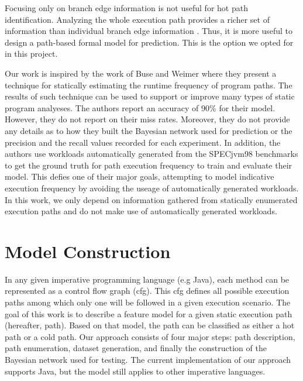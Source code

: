 \documentclass[10pt,twocolumn,letterpaper]{article}
\begin{document}
Focusing only on branch edge information is not useful for hot path identification. Analyzing the whole execution path provides a richer set of information
than individual branch edge information \cite{buse2009road}. Thus, it is more useful to design a path-based formal model for prediction. This is the option we
opted for in this project.

Our work is inspired by the work of Buse and Weimer \cite{buse2009road} where they present a technique for statically estimating the runtime frequency of
program paths. The results of such technique can be used to support or improve many types of static program analyeses. The authors report an accuracy of 90\%
for their model. However, they do not report on their miss rates. Moreover, they do not provide any details as to how they built the Bayesian network used for
prediction or the precision and the recall values recorded for each experiment. In addition, the authors use workloads automatically generated from the
SPECjvm98 benchmarks \cite{specjvm98} to get the ground truth for path execution frequency to train and evaluate their model. This defies one of their major
goals, attempting to model indicative execution frequency by avoiding the useage of automatically generated workloads. In this work, we only depend on
information gathered from statically enumerated execution paths and do not make use of automatically generated workloads.

\section{Model Construction}
\label{sec:implementation}
In any given imperative programming language (e.g Java), each method can be represented as a control flow graph (cfg). This cfg defines all possible execution
paths among which only one will be followed in a given execution scenario. The goal of this work is to describe a feature model for a given static execution
path (hereafter, path). Based on that model, the path can be classified as either a hot path or a cold path. Our approach consists of four major steps: path
description, path enumeration, dataset generation, and finally the construction of the Bayesian network used for testing. The current implementation of our
approach supports Java, but the model still applies to other imperative languages.
\end{document}
